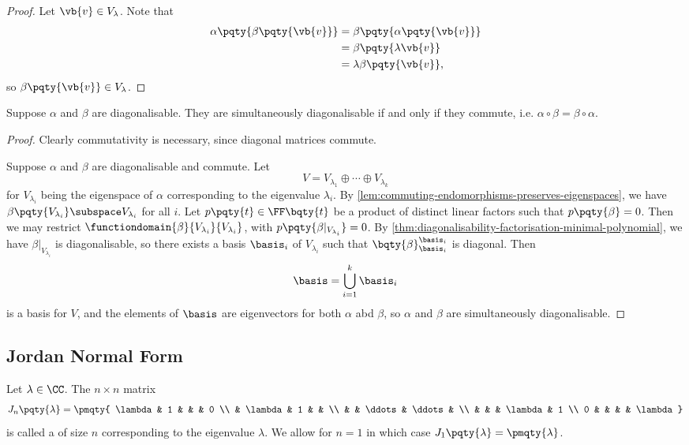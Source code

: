 \begin{proof}
    Let \(\vb{v} \in V_{\lambda}\). Note that
    \begin{align*}
        \alpha\pqty{\beta\pqty{\vb{v}}} &= \beta\pqty{\alpha\pqty{\vb{v}}} \\
        &= \beta \pqty{\lambda \vb{v}} \\
        &= \lambda \beta\pqty{\vb{v}},
    \end{align*}
    so \(\beta\pqty{\vb{v}} \in V_{\lambda}\).
\end{proof}

\begin{theorem}
    Suppose \(\alpha\) and \(\beta\) are diagonalisable. They are simultaneously diagonalisable if and only if they commute, i.e. \(\alpha \circ \beta = \beta \circ \alpha\).
\end{theorem}

\begin{proof}
    Clearly commutativity is necessary, since diagonal matrices commute.

    Suppose \(\alpha\) and \(\beta\) are diagonalisable and commute. Let
    \[
        V = V_{\lambda_1} \oplus \cdots \oplus V_{\lambda_k}
    \]
    for \(V_{\lambda_i}\) being the eigenspace of \(\alpha\) corresponding to the eigenvalue \(\lambda_i\). By \autoref{lem:commuting-endomorphisms-preserves-eigenspaces}, we have \(\beta\pqty{V_{\lambda_i}} \subspace V_{\lambda_i}\) for all \(i\). Let \(p\pqty{t} \in \FF\bqty{t}\) be a product of distinct linear factors such that \(p\pqty{\beta} = 0\). Then we may restrict \(\functiondomain{\beta}{V_{\lambda_i}}{V_{\lambda_i}}\), with \(p\pqty{\beta\vert_{V_{\lambda_i}}} = 0\). By \autoref{thm:diagonalisability-factorisation-minimal-polynomial}, we have \(\beta\vert_{V_{\lambda_i}}\) is diagonalisable, so there exists a basis \(\basis_i\) of \(V_{\lambda_i}\) such that \(\bqty{\beta}_{\basis_i}^{\basis_i}\) is diagonal. Then
    \[
        \basis = \bigcup_{i = 1}^{k} \basis_i
    \]
    is a basis for \(V\), and the elements of \(\basis\) are eigenvectors for both \(\alpha\) abd \(\beta\), so \(\alpha\) and \(\beta\) are simultaneously diagonalisable.
\end{proof}

\subsection{Jordan Normal Form}

\begin{definition}
    Let \(\lambda \in \CC\). The \(n \times n\) matrix
    \[
        J_n\pqty{\lambda} = \pmqty{
            \lambda & 1 & & & 0 \\
             & \lambda & 1 & & \\
             & & \ddots & \ddots & \\
             & & & \lambda & 1 \\
            0 & & & & \lambda
        }
    \]
    is called a  of size \(n\) corresponding to the eigenvalue \(\lambda\). We allow for \(n = 1\) in which case \(J_1\pqty{\lambda} = \pmqty{\lambda}\).
\end{definition}


